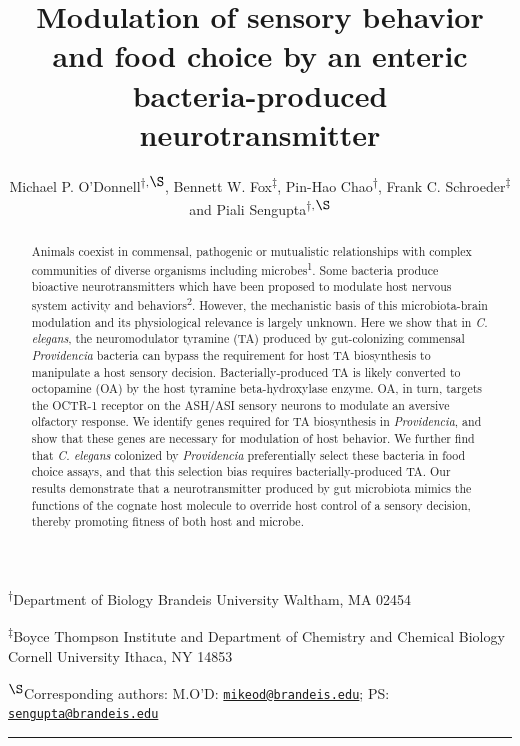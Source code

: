 \documentclass[11pt,]{article}
\title{Modulation of sensory behavior and food choice by an enteric
bacteria-produced neurotransmitter}
\author{Michael P. O'Donnell\textsuperscript{\(\dagger\),\(\S\)}, Bennett W.
Fox\textsuperscript{\(\ddagger\)}, Pin-Hao
Chao\textsuperscript{\(\dagger\)}, Frank C.
Schroeder\textsuperscript{\(\ddagger\)} and Piali
Sengupta\textsuperscript{\(\dagger\),\(\S\)}}
\date{}
\begin{document}
\maketitle
\begin{abstract}
\singlespacing Animals coexist in commensal, pathogenic or mutualistic
relationships with complex communities of diverse organisms including
microbes\textsuperscript{1}. Some bacteria produce bioactive
neurotransmitters which have been proposed to modulate host nervous
system activity and behaviors\textsuperscript{2}. However, the
mechanistic basis of this microbiota-brain modulation and its
physiological relevance is largely unknown. Here we show that in
\textit{C. elegans}, the neuromodulator tyramine (TA) produced by
gut-colonizing commensal \textit{Providencia} bacteria can bypass the
requirement for host TA biosynthesis to manipulate a host sensory
decision. Bacterially-produced TA is likely converted to octopamine (OA)
by the host tyramine beta-hydroxylase enzyme. OA, in turn, targets the
OCTR-1 receptor on the ASH/ASI sensory neurons to modulate an aversive
olfactory response. We identify genes required for TA biosynthesis in
\textit{Providencia}, and show that these genes are necessary for
modulation of host behavior. We further find that \textit{C. elegans}
colonized by \textit{Providencia} preferentially select these bacteria
in food choice assays, and that this selection bias requires
bacterially-produced TA. Our results demonstrate that a neurotransmitter
produced by gut microbiota mimics the functions of the cognate host
molecule to override host control of a sensory decision, thereby
promoting fitness of both host and microbe.
\end{abstract}

\begin{center}
\fontsize{8}{8}
\selectfont

\textsuperscript{\(\dagger\)}Department of Biology Brandeis University
Waltham, MA 02454

\textsuperscript{\(\ddagger\)}Boyce Thompson Institute and Department of
Chemistry and Chemical Biology Cornell University Ithaca, NY 14853

\textsuperscript{\(\S\)}Corresponding authors: M.O'D:
\href{mailto:mikeod@brandeis.edu}{\nolinkurl{mikeod@brandeis.edu}}; PS:
\href{mailto:sengupta@brandeis.edu}{\nolinkurl{sengupta@brandeis.edu}}
\vskip 0.2in

\par

\noindent

\rule{\textwidth}{0.4pt}

\fontsize{11}{12}
\selectfont

\vskip 0.2in

\end{center}
\end{document}
